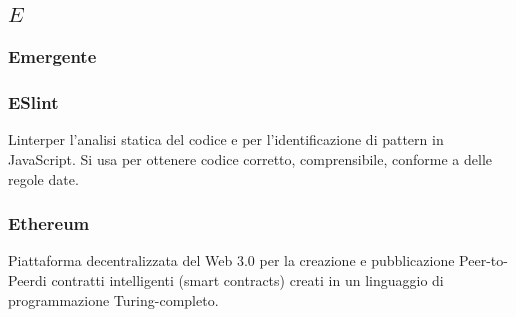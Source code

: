 \subsection*{\quad$E\quad$}

\subsubsection*{Emergente}

\subsubsection*{ESlint}
Linter\glo per l’analisi statica del codice e per l’identificazione di pattern in JavaScript. Si usa per ottenere codice corretto, comprensibile, conforme a delle regole date.

\subsubsection*{Ethereum}
Piattaforma decentralizzata del Web 3.0 per la creazione e pubblicazione Peer-to-Peer\glosp di contratti intelligenti (smart contracts\glo) creati in un linguaggio di programmazione Turing-completo.

